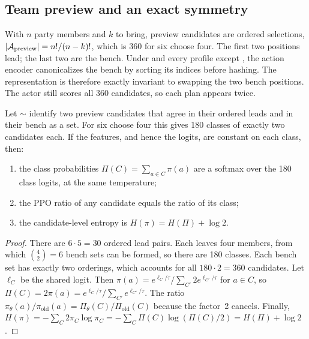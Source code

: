 \subsection{Team preview and an exact symmetry}
With $n$ party members and $k$ to bring, preview candidates are ordered
selections, $|\mathcal{A}_{\mathrm{preview}}|=n!/(n-k)!$, which is 360 for six choose
four. The first two positions lead; the last two are the bench. Under
 and every  profile except
, the action encoder
canonicalizes the bench by sorting its indices before hashing. The
representation is therefore exactly invariant to swapping the two bench
positions. The actor still scores all 360 candidates, so each plan appears
twice.

\begin{proposition}
\label{prop:preview}
Let $\sim$ identify two preview candidates that agree in their ordered leads
and in their bench as a set. For six choose four this gives 180 classes of
exactly two candidates each. If the features, and hence the logits, are
constant on each class, then:
\begin{enumerate}
  \item the class probabilities $\Pi(C)=\sum_{a\in C}\pi(a)$ are a softmax
    over the 180 class logits, at the same temperature;
  \item the PPO ratio of any candidate equals the ratio of its class;
  \item the candidate-level entropy is $H(\pi)=H(\Pi)+\log2$.
\end{enumerate}
\end{proposition}
\begin{proof}
There are $6\cdot5=30$ ordered lead pairs. Each leaves four members, from
which $\binom{4}{2}=6$ bench sets can be formed, so there are 180 classes.
Each bench set has exactly two orderings, which accounts for all
$180\cdot2=360$ candidates. Let $\ell_C$ be the shared logit. Then
$\pi(a)=e^{\ell_C/\tau}/\sum_{C'}2e^{\ell_{C'}/\tau}$ for $a\in C$, so
$\Pi(C)=2\pi(a)=e^{\ell_C/\tau}/\sum_{C'}e^{\ell_{C'}/\tau}$. The ratio
$\pi_\theta(a)/\pi_{\mathrm{old}}(a)=\Pi_\theta(C)/\Pi_{\mathrm{old}}(C)$
because the factor~2 cancels. Finally,
$H(\pi)=-\sum_C2\pi_C\log\pi_C=-\sum_C\Pi(C)\log(\Pi(C)/2)=H(\Pi)+\log2$.
\end{proof}



